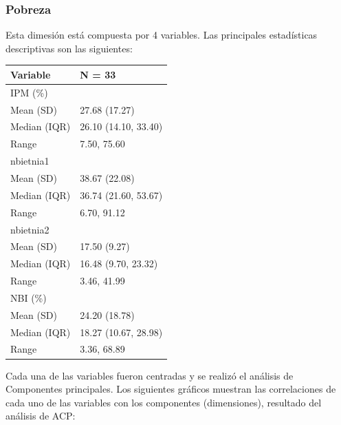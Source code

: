 \hypertarget{pobreza}{%
\subsubsection{Pobreza}\label{pobreza}}

Esta dimesión está compuesta por 4 variables. Las principales
estadísticas descriptivas son las siguientes:

\begin{table}
\centering\begingroup\fontsize{7}{9}\selectfont

\begin{tabular}{ll}
\toprule
Variable & N = 33\\
\midrule
IPM (\%) & \\
\hspace{1em}Mean (SD) & 27.68 (17.27)\\
\hspace{1em}Median (IQR) & 26.10 (14.10, 33.40)\\
\hspace{1em}Range & 7.50, 75.60\\
nbietnia1 & \\
\addlinespace
\hspace{1em}Mean (SD) & 38.67 (22.08)\\
\hspace{1em}Median (IQR) & 36.74 (21.60, 53.67)\\
\hspace{1em}Range & 6.70, 91.12\\
nbietnia2 & \\
\hspace{1em}Mean (SD) & 17.50 (9.27)\\
\addlinespace
\hspace{1em}Median (IQR) & 16.48 (9.70, 23.32)\\
\hspace{1em}Range & 3.46, 41.99\\
NBI (\%) & \\
\hspace{1em}Mean (SD) & 24.20 (18.78)\\
\hspace{1em}Median (IQR) & 18.27 (10.67, 28.98)\\
\addlinespace
\hspace{1em}Range & 3.36, 68.89\\
\bottomrule
\end{tabular}
\endgroup{}
\end{table}

Cada una de las variables fueron centradas y se realizó el análisis de
Componentes principales. Los siguientes gráficos muestran las
correlaciones de cada uno de las variables con los componentes
(dimensiones), resultado del análisis de ACP:

